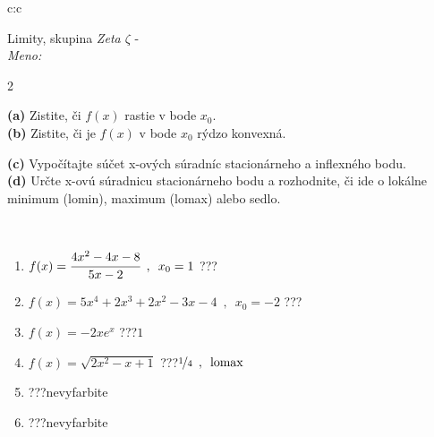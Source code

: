 \documentclass[10pt]{report}
\begin{document}
\begin{tabular}{c:c}
\begin{minipage}[c][104.5mm][t]{0.5\linewidth}
\begin{center}
\vspace{7mm}
{\huge Limity, skupina \textit{Zeta $\zeta$} -}\\[5mm]
\textit{Meno:}\phantom{xxxxxxxxxxxxxxxxxxxxxxxxxxxxxxxxxxxxxxxxxxxxxxxxxxxxxxxxxxxxxxxxx}\\[5mm]
\begin{minipage}{0.95\linewidth}
\begin{center}
{\small \begin{multicols}{2} \raggedright
\textbf{(a)} Zistite, či \(f(x)\) rastie v bode \(x_0\). \\[1mm]
\textbf{(b)} Zistite, či je \(f(x)\) v bode \(x_0\) rýdzo konvexná. \par \columnbreak
\textbf{(c)} Vypočítajte súčet x-ových súradníc stacionárneho a inflexného bodu. \\[1mm]
\textbf{(d)} Určte x-ovú súradnicu stacionárneho bodu a rozhodnite, či ide o lokálne minimum (lomin), maximum (lomax) alebo sedlo. \\[1mm]
\end{multicols}
}
\end{center}
\end{minipage}
\\[4mm]
\begin{minipage}{0.79\linewidth}
\begin{center}
\begin{varwidth}{\linewidth}
\begin{enumerate}
\normalsize
\item $f(x)=\cfrac{4x^2-4x-8}{5x-2}\enspace , \enspace x_0=1$\quad \dotfill\; ???\;\dotfill \quad {}
\item $f(x)=5x^4+2x^3+2x^2-3x-4\enspace , \enspace x_0=-2$\quad \dotfill\; ???\;\dotfill \quad {}
\item $f(x)=-2xe^{x}$\quad \dotfill\; ???\;\dotfill \quad $1$
\item $f(x)=\sqrt{2x^2-x+1}$\quad \dotfill\; ???\;\dotfill \quad $\nicefrac{1}{4}\enspace , \enspace\text{lomax}$
\item \quad \dotfill\; ???\;\dotfill \quad nevyfarbite
\item \quad \dotfill\; ???\;\dotfill \quad nevyfarbite
\end{enumerate}
\end{varwidth}
\end{center}

\end{minipage}
\end{center}
\end{minipage}
\end{tabular}
\end{document}
